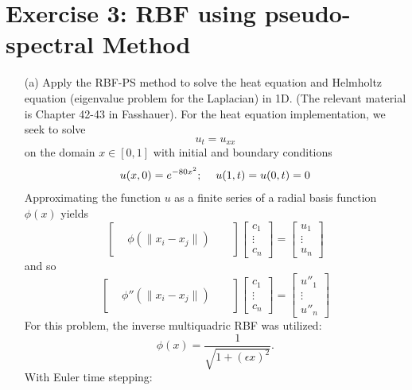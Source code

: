 \documentclass{article}
\begin{document}
\section*{Exercise 3: RBF using pseudo-spectral Method}
\begin{itemize}
    \item[(a)] Apply the RBF-PS method to solve the heat equation and Helmholtz equation (eigenvalue problem for the Laplacian) in 1D. (The relevant material is Chapter 42-43 in Fasshauer).
    \newline\newline
    For the heat equation implementation, we seek to solve
    \[u_t = u_{xx}\]
    on the domain $x \in [0,1]$ with initial and boundary conditions
    \[u(x,0) = e^{-80x^2}; \hspace{1.2em} u(1,t) = u(0,t) = 0\]
    Approximating the function $u$ as a finite series of a radial basis function $\phi(x)$ yields
    \[\begin{bmatrix}
        & & &\\
        & \phi(\|x_i - x_j\|) & \\
        & & & 
    \end{bmatrix}\begin{bmatrix}
        c_1\\
        \vdots\\
        c_n
    \end{bmatrix} = \begin{bmatrix}
        u_1\\
        \vdots\\
        u_n
    \end{bmatrix}\]
    and so
    \[\begin{bmatrix}
         & & &\\
         & \phi''(\|x_i - x_j\|) & \\
          & & &
    \end{bmatrix}\begin{bmatrix}
        c_1\\
        \vdots\\
        c_n
    \end{bmatrix} = \begin{bmatrix}
        u''_1\\
        \vdots\\
        u''_n
    \end{bmatrix}\]
    For this problem, the inverse multiquadric RBF was utilized:
    \[\phi(x) = \frac{1}{\sqrt{1 + (\epsilon x)^2}}.\]
    With Euler time stepping:

\end{itemize}
\end{document}
